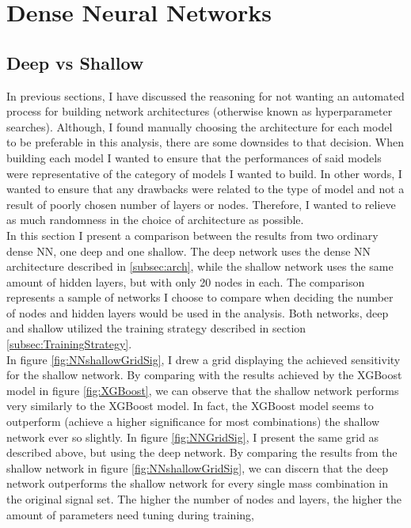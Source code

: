 \section{Dense Neural Networks}
\subsection{Deep vs Shallow}
In previous sections, I have discussed the reasoning for not wanting an automated process for building network architectures (otherwise known
as hyperparameter searches). Although, I found manually choosing the architecture for each model to be preferable in this analysis, there 
are some downsides to that decision. When building each model I wanted to ensure that the performances of said models were representative of 
the category of models I wanted to build. In other words, I wanted to ensure that any drawbacks were related to the type of model and not 
a result of poorly chosen number of layers or nodes. Therefore, I wanted to relieve as much randomness in the choice of architecture as possible.
\\
In this section I present a comparison between the results from two ordinary dense \ac{NN}, one deep and one shallow. The deep network 
uses the dense \ac{NN} architecture described in \ref{subsec:arch}, while the shallow network uses the same amount of hidden layers,
but with only 20 nodes in each. The comparison represents a sample of networks I choose to compare when deciding the number of nodes and 
hidden layers would be used in the analysis. Both networks, deep and shallow utilized the training strategy described in section 
\ref{subsec:TrainingStrategy}.\\
In figure \ref{fig:NNshallowGridSig}, I drew a grid displaying the achieved sensitivity for the shallow 
network. By comparing with the results achieved by the XGBoost model in figure \ref{fig:XGBoost}, we can observe that the shallow network 
performs very similarly to the XGBoost model. In fact, the XGBoost model seems to outperform (achieve a higher significance for most combinations) 
the shallow network ever so slightly.
In figure \ref{fig:NNGridSig}, I present the same grid as described above, but using the deep network. By comparing the results from the shallow 
network in figure \ref{fig:NNshallowGridSig}, we can discern that the deep network outperforms the shallow network for every single mass 
combination in the original signal set. The higher the number of nodes and layers, the higher the amount of parameters need tuning during training, 
